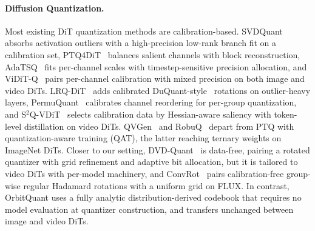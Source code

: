 \vspace{-2mm}
\paragraph{Diffusion Quantization.}
Most existing DiT quantization methods are calibration-based. SVDQuant~\cite{li2024svdquant} absorbs activation outliers with a high-precision low-rank branch fit on a calibration set, PTQ4DiT~\cite{wu2024ptq4dit} balances salient channels with block reconstruction, AdaTSQ~\cite{zhang2026adatsq} fits per-channel scales with timestep-sensitive precision allocation, and ViDiT-Q~\cite{zhao2024vidit} pairs per-channel calibration with mixed precision on both image and video DiTs. LRQ-DiT~\cite{yang2025lrq} adds calibrated DuQuant-style~\cite{lin2024duquant} rotations on outlier-heavy layers, PermuQuant~\cite{cheng2026permuquant} calibrates channel reordering for per-group quantization, and S$^2$Q-VDiT~\cite{feng2025s} selects calibration data by Hessian-aware saliency with token-level distillation on video DiTs. QVGen~\cite{huang2025qvgen} and RobuQ~\cite{yang2025robuq} depart from PTQ with quantization-aware training (QAT), the latter reaching ternary weights on ImageNet DiTs. Closer to our setting, DVD-Quant~\cite{li2025dvd} is data-free, pairing a rotated quantizer with grid refinement and adaptive bit allocation, but it is tailored to video DiTs with per-model machinery, and ConvRot~\cite{huang2025convrot} pairs calibration-free group-wise regular Hadamard rotations with a uniform grid on FLUX. In contrast, OrbitQuant uses a fully analytic distribution-derived codebook that requires no model evaluation at quantizer construction, and transfers unchanged between image and video DiTs.


